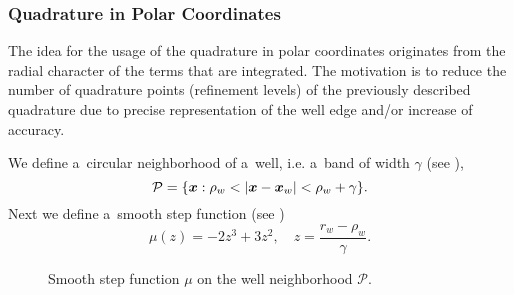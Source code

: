 \subsubsection{Quadrature in Polar Coordinates}

The idea for the usage of the quadrature in polar coordinates originates from the radial character of the terms
that are integrated. 
The motivation is to reduce the number of quadrature points (refinement levels) of the previously described quadrature due to
precise representation of the well edge and/or increase of accuracy.

We define a~circular neighborhood of a~well, i.e. a~band of width $\gamma$ (see ),
\begin{equation}
    \mathcal{P} = \{\mathbf{\boldsymbol{x}}: \rho_w < \left|\mathbf{\boldsymbol{x}} - \mathbf{\boldsymbol{x}}_w\right| < \rho_w + \gamma \}.
\end{equation} 
Next we define a~smooth step function (see )
\begin{equation}
    \mu(z) = -2 z^3 +3 z^2,\quad z=\frac{r_w-\rho_w}{\gamma}.
\end{equation} 
%
\begin{figure}[!htb]
  \vspace{-35pt}
  \centering    
  \hspace{0pt}
  \caption[Smooth step function in polar quadrature.]
  {Smooth step function $\mu$ on the well neighborhood $\mathcal{P}$.
  }
  \label{fig:smooth_step_well_band}
\end{figure}    

